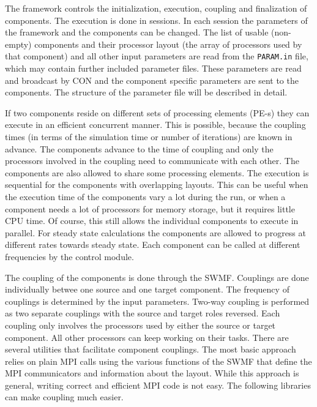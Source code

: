 The framework controls the initialization, execution, coupling and
finalization of components.  The execution is done in sessions. In
each session the parameters of the framework and the components can be
changed. The list of usable (non-empty) components and their 
processor layout (the array of processors used by that component)
and all other input parameters are read from the {\tt PARAM.in} file, which
may contain further included parameter files.  These parameters are
read and broadcast by CON and the component specific parameters are
sent to the components. The structure of the parameter file will be
described in detail.

If two components reside on different sets of processing elements
(PE-s) they can execute in an efficient concurrent manner.
This is possible, because the coupling times (in terms of the simulation time
or number of iterations) are known in advance.  
The components advance to the time of coupling and
only the processors involved in the coupling need to communicate with
each other. The components are also allowed to share some processing elements.
The execution is sequential for the components with overlapping layouts.
This can be useful when the execution time of the components vary a lot
during the run, or when a component needs a lot of processors 
for memory storage, but it requires little CPU time.
Of course, this still allows the individual components to execute in parallel.
For steady state calculations the components are allowed to progress
at different rates towards steady state. Each component can be called
at different frequencies by the control module.

The coupling of the components is done through the SWMF. 
Couplings are done individually betwee one source and one target component.
The frequency of couplings is determined by the input parameters.
Two-way coupling is performed as two separate couplings
with the source and target roles reversed.
Each coupling only involves the processors used by either the
source or target component. All other processors can keep working
on their tasks.
There are several utilities that facilitate component couplings. 
The most basic approach relies on plain MPI calls using the various 
functions of the SWMF that define the MPI communicators
and information about the layout. While this approach is general,
writing correct and efficient MPI code is not easy. The following
libraries can make coupling much easier.

